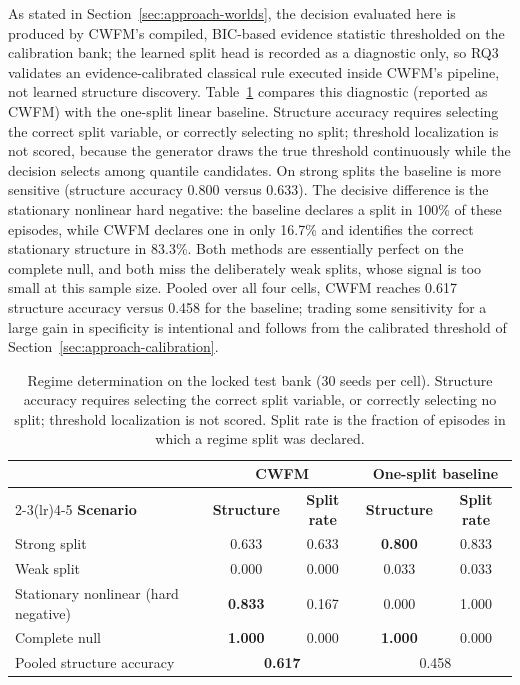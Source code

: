 \documentclass[electronics,article,submit,oneauthor]{Definitions/mdpi}
\begin{document}
As stated in Section~\ref{sec:approach-worlds}, the decision evaluated here is produced by CWFM's compiled, BIC-based evidence statistic thresholded on the calibration bank; the learned split head is recorded as a diagnostic only, so RQ3 validates an evidence-calibrated classical rule executed inside CWFM's pipeline, not learned structure discovery. Table~\ref{tab:regime} compares this diagnostic (reported as CWFM) with the one-split linear baseline. Structure accuracy requires selecting the correct split variable, or correctly selecting no split; threshold localization is not scored, because the generator draws the true threshold continuously while the decision selects among quantile candidates. On strong splits the baseline is more sensitive (structure accuracy 0.800 versus 0.633). The decisive difference is the stationary nonlinear hard negative: the baseline declares a split in 100\% of these episodes, while CWFM declares one in only 16.7\% and identifies the correct stationary structure in 83.3\%. Both methods are essentially perfect on the complete null, and both miss the deliberately weak splits, whose signal is too small at this sample size. Pooled over all four cells, CWFM reaches 0.617 structure accuracy versus 0.458 for the baseline; trading some sensitivity for a large gain in specificity is intentional and follows from the calibrated threshold of Section~\ref{sec:approach-calibration}.

\begin{table}[!t]
\caption{Regime determination on the locked test bank (30 seeds per cell). Structure accuracy requires selecting the correct split variable, or correctly selecting no split; threshold localization is not scored. Split rate is the fraction of episodes in which a regime split was declared.\label{tab:regime}}
\begin{tabularx}{\textwidth}{Xcccc}
\toprule
& \multicolumn{2}{c}{\textbf{CWFM}} & \multicolumn{2}{c}{\textbf{One-split baseline}}\\
\cmidrule(lr){2-3}\cmidrule(lr){4-5}
\textbf{Scenario} & \textbf{Structure} & \textbf{Split rate} & \textbf{Structure} & \textbf{Split rate}\\
\midrule
Strong split & 0.633 & 0.633 & \textbf{0.800} & 0.833\\
Weak split & 0.000 & 0.000 & 0.033 & 0.033\\
Stationary nonlinear (hard negative) & \textbf{0.833} & 0.167 & 0.000 & 1.000\\
Complete null & \textbf{1.000} & 0.000 & \textbf{1.000} & 0.000\\
\midrule
Pooled structure accuracy & \multicolumn{2}{c}{\textbf{0.617}} & \multicolumn{2}{c}{0.458}\\
\bottomrule
\end{tabularx}
\end{table}
\end{document}
